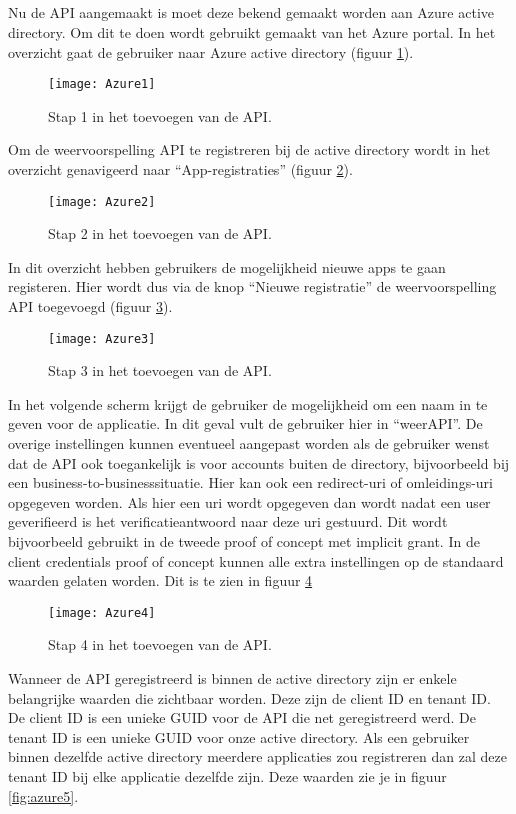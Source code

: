 \subsection{}
Nu de API aangemaakt is moet deze bekend gemaakt worden aan Azure active directory. Om dit te doen wordt gebruikt gemaakt van het Azure portal. In het overzicht gaat de gebruiker naar Azure active directory (figuur \ref{fig:azure1}).
\begin{figure}[H]
	\centering
	\texttt{[image: Azure1]} 
	\caption[BeginAzure]{Stap 1 in het toevoegen van de API.}
	\label{fig:azure1}
\end{figure}
Om de weervoorspelling API te registreren bij de active directory wordt in het overzicht genavigeerd naar “App-registraties” (figuur \ref{fig:azure2}).
\begin{figure}[H]
	\centering
	\texttt{[image: Azure2]} 
	\caption[Azure2]{Stap 2 in het toevoegen van de API.}
	\label{fig:azure2}
\end{figure}
In dit overzicht hebben gebruikers de mogelijkheid nieuwe apps te gaan registeren. Hier wordt dus via de knop “Nieuwe registratie” de weervoorspelling API toegevoegd (figuur \ref{fig:azure3}).
\begin{figure}[H]
	\centering
	\texttt{[image: Azure3]} 
	\caption[Azure3]{Stap 3 in het toevoegen van de API.}
	\label{fig:azure3}
\end{figure}
In het volgende scherm krijgt de gebruiker de mogelijkheid om een naam in te geven voor de applicatie. In dit geval vult de gebruiker hier in “weerAPI”. De overige instellingen kunnen eventueel aangepast worden als de gebruiker wenst dat de API ook toegankelijk is voor accounts buiten de directory, bijvoorbeeld bij een business-to-businesssituatie. Hier kan ook een redirect-uri of omleidings-uri opgegeven worden. Als hier een uri wordt opgegeven dan wordt nadat een user geverifieerd is het verificatieantwoord naar deze uri gestuurd. Dit wordt bijvoorbeeld gebruikt in de tweede proof of concept met implicit grant. In de client credentials proof of concept kunnen alle extra instellingen op de standaard waarden gelaten worden. Dit is te zien in figuur \ref{fig:azure4}
\begin{figure}[H]
	\centering
	\texttt{[image: Azure4]} 
	\caption[Azure4]{Stap 4 in het toevoegen van de API.}
	\label{fig:azure4}
\end{figure}\newpage
Wanneer de API geregistreerd is binnen de active directory zijn er enkele belangrijke waarden die zichtbaar worden. Deze zijn de client ID en tenant ID. De client ID is een unieke GUID voor de API die net geregistreerd werd. De tenant ID is een unieke GUID voor onze active directory. Als een gebruiker binnen dezelfde active directory meerdere applicaties zou registreren dan zal deze tenant ID bij elke applicatie dezelfde zijn. Deze waarden zie je in figuur \ref{fig:azure5}.
